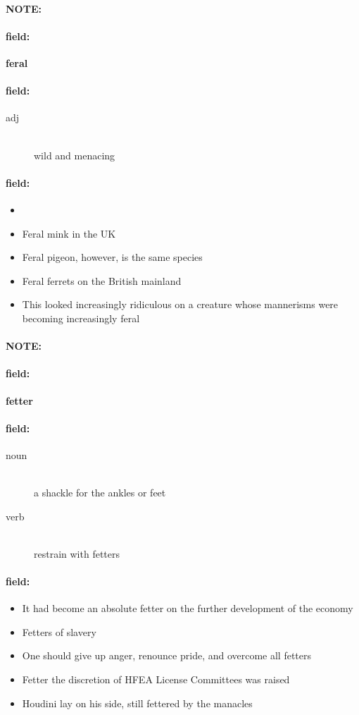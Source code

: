 \documentclass[12pt]{article}
\newenvironment{note}{\paragraph{NOTE:}}{}
\newenvironment{field}{\paragraph{field:}}{}
\begin{document}
\begin{note}
\begin{field}
\textbf{\large feral}
\end{field}


\begin{field}
\begin{description}
\item[adj] \hfill \\ 
wild and menacing

\end{description}
\end{field}

\begin{field}
\begin{itemize}
\item 
\item Feral mink in the UK
\item Feral pigeon, however, is the same species
\item Feral ferrets on the British mainland
\item This looked increasingly ridiculous on a creature whose mannerisms were becoming increasingly feral
\end{itemize}
\end{field}
\end{note}
\begin{note}
\begin{field}
\textbf{\large fetter}
\end{field}


\begin{field}
\begin{description}
\item[noun] \hfill \\ 
a shackle for the ankles or feet

\item[verb] \hfill \\ 
restrain with fetters

\end{description}
\end{field}

\begin{field}
\begin{itemize}
\item It had become an absolute fetter on the further development of the economy
\item Fetters of slavery
\item One should give up anger, renounce pride, and overcome all fetters
\item Fetter the discretion of HFEA License Committees was raised
\item Houdini lay on his side, still fettered by the manacles
\end{itemize}
\end{field}
\end{note}
\end{document}
